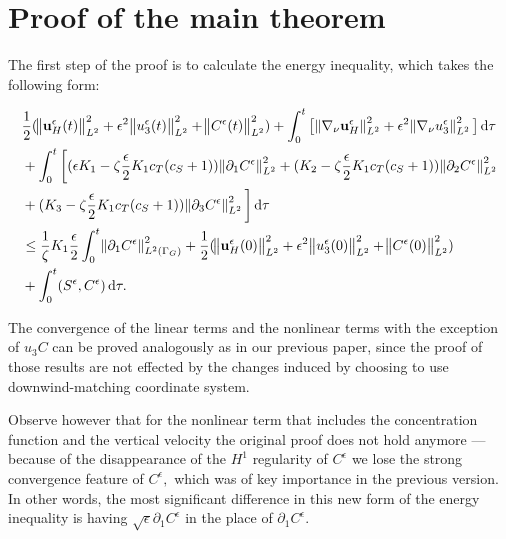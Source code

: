 \documentclass[11pt]{article}
\newcommand*\diff{\mathop{}\!\mathrm{d}}
\begin{document}
\section{Proof of the main theorem} \label{proof}

The first step of the proof is to calculate the energy inequality, which takes the following form:

  \begin{equation}\nonumber
    \begin{split}  
    & \frac{1}{2} (\norm{\mathbf{u}_H^\epsilon (t)}_{L^2}^2 + \epsilon ^ 2 \norm{u_3^\epsilon (t)}_{L^2}^2 + \norm{C^\epsilon (t)}_{L^2}^2) + \int_0 ^ t \big [\norm{\nabla_\nu \mathbf{u}_H^\epsilon}_{L^2}^2 + \epsilon ^ 2 \norm{\nabla_\nu u_3^\epsilon}_{L^2}^2 \big ] \diff \tau \\
    & + \int_0 ^ t \bigg[ (\epsilon K_1 - \zeta \frac{\epsilon}{2} K_1 c_T (c_S + 1)) \norm{\partial_1 C^\epsilon}_{L^2}^2  + (K_2 - \zeta \frac{\epsilon}{2} K_1 c_T (c_S + 1)) \norm{\partial_2 C^\epsilon}_{L^2}^2 \\
    & + (K_3 - \zeta \frac{\epsilon}{2} K_1 c_T (c_S + 1)) \norm{\partial_3 C^\epsilon}_{L^2}^2 \bigg] \diff \tau \\
    & \leq \frac{1}{\zeta} K_1 \frac{\epsilon}{2} \int_0 ^ t \norm{\partial_1 C^\epsilon}^2 _{L^2 (\Gamma_G)} + \frac{1}{2} (\norm{\mathbf{u}_H^\epsilon (0)}_{L^2}^2 + \epsilon ^ 2 \norm{u_3^\epsilon (0)}_{L^2}^2 + \norm{C^\epsilon (0)}_{L^2}^2) \\
    & + \int_0^t (S^\epsilon,C^\epsilon) \diff \tau.
    \end{split}
  \end{equation}
  
The convergence of the linear terms and the nonlinear terms with the exception of $u_3 C$ can be proved analogously as in our previous paper, since the proof of those results are not effected by the changes induced by choosing to use downwind-matching coordinate system.

Observe however that for the nonlinear term that includes the concentration function and the vertical velocity the original proof does not hold anymore --- because of the disappearance of the $H^1$ regularity of $C^\epsilon$ we lose the strong convergence feature of $C^\epsilon,$ which was of key importance in the previous version. In other words, the most significant difference in this new form of the energy inequality is having $\sqrt{\epsilon} \partial_1 C^\epsilon$ in the place of $\partial_1 C^\epsilon.$
\end{document}
